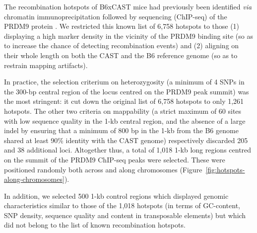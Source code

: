 The recombination hotspots of B6xCAST mice had previously been identified \textit{via} chromatin immunoprecipitation followed by sequencing (ChIP-seq) of the PRDM9 protein \citep{baker2015prdm9}.
We restricted this known list of 6,758 hotspots to those (1) displaying a high marker density in the vicinity of the PRDM9 binding site (so as to increase the chance of detecting recombination events) and (2) aligning on their whole length on both the CAST and the B6 reference genome (so as to restrain mapping artifacts).

In practice, the selection criterium on heterozygosity (a minimum of 4 SNPs in the 300-bp central region of the locus centred on the PRDM9 peak summit) was the most stringent: it cut down the original list of 6,758 hotspots to only 1,261 hotspots.
The other two criteria on mappability (a strict maximum of 60 sites with low sequence quality in the 1-kb central region, and the absence of a large indel by ensuring that a minimum of 800 bp in the 1-kb from the B6 genome shared at least 90\% identity with the CAST genome) respectively discarded 205 and 38 additional loci.
Altogether thus, a total of 1,018 1-kb long regions centred on the summit of the PRDM9 ChIP-seq peaks were selected.
These were positioned randomly both across and along chromosomes (Figure~\ref{fig:hotspots-along-chromosomes}).








In addition, we selected 500 1-kb control regions which displayed genomic characteristics similar to those of the 1,018 hotspots (in terms of GC-content, SNP density, sequence quality and content in transposable elements) but which did not belong to the list of known recombination hotspots.

